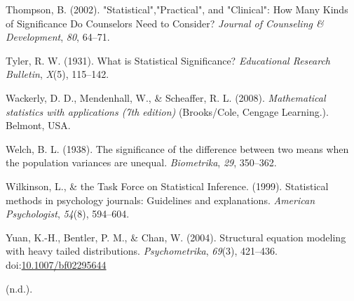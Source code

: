 \documentclass[
  man,floatsintext]{apa6}
\begin{document}
\leavevmode\hypertarget{ref-Thompson_2002}{}%
Thompson, B. (2002). "Statistical","Practical", and "Clinical": How Many Kinds of Significance Do Counselors Need to Consider? \emph{Journal of Counseling \& Development}, \emph{80}, 64--71.

\leavevmode\hypertarget{ref-Tyler_1931}{}%
Tyler, R. W. (1931). What is Statistical Significance? \emph{Educational Research Bulletin}, \emph{X}(5), 115--142.

\leavevmode\hypertarget{ref-Wackerly_et_al_2008}{}%
Wackerly, D. D., Mendenhall, W., \& Scheaffer, R. L. (2008). \emph{Mathematical statistics with applications (7th edition)} (Brooks/Cole, Cengage Learning.). Belmont, USA.

\leavevmode\hypertarget{ref-Welch_1938}{}%
Welch, B. L. (1938). The significance of the difference between two means when the population variances are unequal. \emph{Biometrika}, \emph{29}, 350--362.

\leavevmode\hypertarget{ref-Wilkinson_1999}{}%
Wilkinson, L., \& the Task Force on Statistical Inference. (1999). Statistical methods in psychology journals: Guidelines and explanations. \emph{American Psychologist}, \emph{54}(8), 594--604.

\leavevmode\hypertarget{ref-Yuan_et_al_2004}{}%
Yuan, K.-H., Bentler, P. M., \& Chan, W. (2004). Structural equation modeling with heavy tailed distributions. \emph{Psychometrika}, \emph{69}(3), 421--436. doi:\href{https://doi.org/10.1007/bf02295644}{10.1007/bf02295644}

\leavevmode\hypertarget{ref-Keselman_et_al_2008}{}%
(n.d.).

\clearpage
\makeatletter
\efloat@restorefloats
\makeatother
\end{document}
